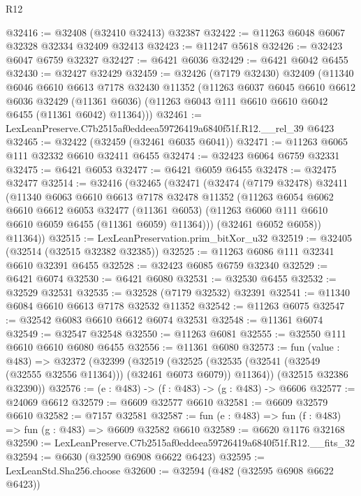 \begin{lexlean}{R12}
\begin{coremodule}
@32416 := @32408 (@32410 @32413) @32387
@32422 := @11263 @6048 @6067 @32328 @32334 @32409 @32413
@32423 := @11247 @5618
@32426 := @32423 @6047 @6759 @32327
@32427 := @6421 @6036
@32429 := @6421 @6042 @6455
@32430 := @32427 @32429
@32459 := @32426
    (@7179 @32430)
    @32409
    (@11340
      @6046
      @6610
      @6613
      @7178
      @32430
      @11352
      (@11263
        @6037
        @6045
        @6610
        @6612
        @6036
        @32429
        (@11361 @6036)
        (@11263 @6043 @111 @6610 @6610 @6042 @6455 (@11361 @6042) @11364)))
@32461 := LexLeanPreserve.C7b2515af0eddeea59726419a6840f51f.R12.__rel_39 @6423
@32465 := @32422 (@32459 (@32461 @6035 @6041))
@32471 := @11263 @6065 @111 @32332 @6610 @32411 @6455
@32474 := @32423 @6064 @6759 @32331
@32475 := @6421 @6053
@32477 := @6421 @6059 @6455
@32478 := @32475 @32477
@32514 := @32416
    (@32465
      (@32471
        (@32474
          (@7179 @32478)
          @32411
          (@11340
            @6063
            @6610
            @6613
            @7178
            @32478
            @11352
            (@11263
              @6054
              @6062
              @6610
              @6612
              @6053
              @32477
              (@11361 @6053)
              (@11263 @6060 @111 @6610 @6610 @6059 @6455 (@11361 @6059) @11364)))
          (@32461 @6052 @6058))
        @11364))
@32515 := LexLeanPreservation.prim_bitXor_u32
@32519 := @32405 (@32514 (@32515 @32382 @32385))
@32525 := @11263 @6086 @111 @32341 @6610 @32391 @6455
@32528 := @32423 @6085 @6759 @32340
@32529 := @6421 @6074
@32530 := @6421 @6080
@32531 := @32530 @6455
@32532 := @32529 @32531
@32535 := @32528 (@7179 @32532) @32391
@32541 := @11340 @6084 @6610 @6613 @7178 @32532 @11352
@32542 := @11263 @6075
@32547 := @32542 @6083 @6610 @6612 @6074 @32531
@32548 := @11361 @6074
@32549 := @32547 @32548
@32550 := @11263 @6081
@32555 := @32550 @111 @6610 @6610 @6080 @6455
@32556 := @11361 @6080
@32573 := fun (value : @483) =>
  @32372
    (@32399
      (@32519
        (@32525 (@32535 (@32541 (@32549 (@32555 @32556 @11364))) (@32461 @6073 @6079)) @11364))
      (@32515 @32386 @32390))
@32576 := (e : @483) -> (f : @483) -> (g : @483) -> @6606
@32577 := @24069 @6612
@32579 := @6609 @32577 @6610
@32581 := @6609 @32579 @6610
@32582 := @7157 @32581
@32587 := fun (e : @483) => fun (f : @483) => fun (g : @483) => @6609 @32582 @6610
@32589 := @6620 @1176 @32168
@32590 := LexLeanPreserve.C7b2515af0eddeea59726419a6840f51f.R12.__fits_32
@32594 := @6630 (@32590 @6908 @6622 @6423)
@32595 := LexLeanStd.Sha256.choose
@32600 := @32594 (@482 (@32595 @6908 @6622 @6423))

\end{coremodule}
\end{lexlean}
